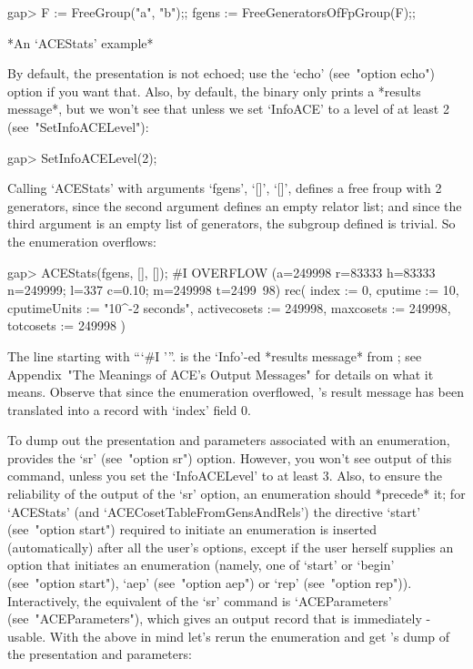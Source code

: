 \beginexample
gap> F := FreeGroup("a", "b");; fgens := FreeGeneratorsOfFpGroup(F);;
\endexample

*An `ACEStats' example*

By  default,  the  presentation  is  not  echoed;   use   the   `echo'
(see~"option echo") option if you want that.  Also,  by  default,  the
{\ACE} binary only prints a *results message*, but we won't  see  that
unless   we   set   `InfoACE'   to   a   level   of   at    least    2
(see~"SetInfoACELevel"):

\beginexample
gap> SetInfoACELevel(2);
\endexample

Calling `ACEStats' with arguments `fgens', `[]', `[]', defines a  free
froup with 2 generators, since the second argument  defines  an  empty
relator list; and since  the  third  argument  is  an  empty  list  of
generators, the  subgroup  defined  is  trivial.  So  the  enumeration
overflows:

\beginexample
gap> ACEStats(fgens, [], []);
#I  OVERFLOW (a=249998 r=83333 h=83333 n=249999; l=337 c=0.10; m=249998 t=2499\
98)
rec( index := 0, cputime := 10, cputimeUnits := "10^-2 seconds", 
  activecosets := 249998, maxcosets := 249998, totcosets := 249998 )
\endexample

The  line  starting  with   ```\#I  '''.  is  the  `Info'-ed  *results
message* from {\ACE};  see  Appendix~"The  Meanings  of  ACE's  Output
Messages" for details  on  what  it  means.  Observe  that  since  the
enumeration overflowed, {\ACE}'s result message  has  been  translated
into a {\GAP} record with `index' field 0.

To dump  out  the  presentation  and  parameters  associated  with  an
enumeration,  {\ACE}  provides  the  `sr'  (see~"option  sr")  option.
However, you won't see output of this  command,  unless  you  set  the
`InfoACELevel' to at least 3. Also, to ensure the reliability  of  the
output of the `sr' option, an enumeration  should  *precede*  it;  for
`ACEStats' (and `ACECosetTableFromGensAndRels') the directive  `start'
(see~"option start") required to initiate an enumeration  is  inserted
(automatically) after all the  user's  options,  except  if  the  user
herself supplies an option that initiates an enumeration (namely,  one
of `start' or `begin' (see~"option start"), `aep'  (see~"option  aep")
or `rep' (see~"option rep")). Interactively,  the  equivalent  of  the
`sr' command is `ACEParameters' (see~"ACEParameters"), which gives  an
output record that is immediately {\GAP}-usable.  With  the  above  in
mind let's  rerun  the  enumeration  and  get  {\ACE}'s  dump  of  the
presentation and parameters:

